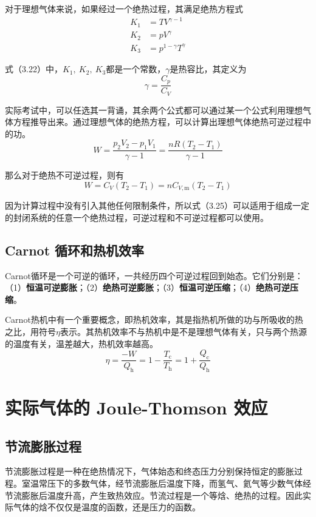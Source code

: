 \documentclass[lang=cn,newtx,10pt,scheme=chinese]{elegantbook}
\begin{document}
对于理想气体来说，如果经过一个绝热过程，其满足绝热方程式
\begin{equation}
	\begin{aligned}
		K_1 &=  TV^{\gamma -1}  \\[1.5ex]
		K_2 &=  pV^{\gamma}  \\[1.5ex]
		K_3 &= p^{1-\gamma}T^{\gamma} 
	\end{aligned}
\end{equation}

式（3.22）中，$K_1,\ K_2,\ K_3$都是一个常数，$\gamma$是热容比，其定义为
\begin{equation}
	\gamma = \frac{C_p}{C_V}
\end{equation}

实际考试中，可以任选其一背诵，其余两个公式都可以通过某一个公式利用理想气体方程推导出来。通过理想气体的绝热方程，可以计算出理想气体绝热可逆过程中的功。
\begin{equation}
	W =\frac{p_2V_2-p_1V_1}{\gamma -1} = \frac{nR(T_2-T_1)}{\gamma -1}
\end{equation}

那么对于绝热不可逆过程，则有
\begin{equation}
	W=C_V(T_2-T_1)=nC_{V,\mathrm{m}}(T_2-T_1)
\end{equation}

因为计算过程中没有引入其他任何限制条件，所以式（3.25）可以适用于组成一定的封闭系统的任意一个绝热过程，可逆过程和不可逆过程都可以使用。

\subsection{Carnot 循环和热机效率}
Carnot循环是一个可逆的循环，一共经历四个可逆过程回到始态。它们分别是：（1）\textbf{恒温可逆膨胀}；（2）\textbf{绝热可逆膨胀}；（3）\textbf{恒温可逆压缩}；（4）\textbf{绝热可逆压缩}。

Carnot热机中有一个重要概念，即热机效率，其是指热机所做的功与所吸收的热之比，用符号$\eta$表示。其热机效率不与热机中是不是理想气体有关，只与两个热源的温度有关，温差越大，热机效率越高。
\begin{equation}
	\eta = \frac{-W}{Q_\mathrm{h}}=1-\frac{T_\mathrm{c}}{T_\mathrm{h}} = 1+\frac{Q_\mathrm{c}}{Q_\mathrm{h}}
\end{equation}

\section{实际气体的 Joule-Thomson 效应}
\subsection{节流膨胀过程}
节流膨胀过程是一种在绝热情况下，气体始态和终态压力分别保持恒定的膨胀过程。室温常压下的多数气体，经节流膨胀后温度下降，而氢气、氦气等少数气体经节流膨胀后温度升高，产生致热效应。节流过程是一个等焓、绝热的过程。因此实际气体的焓不仅仅是温度的函数，还是压力的函数。
\end{document}
